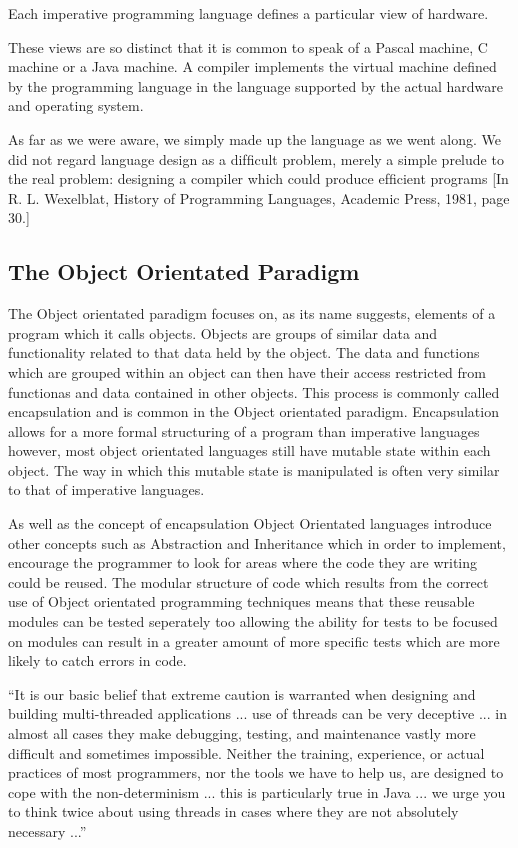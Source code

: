 \documentclass[main.tex]{subfiles}
\begin{document}
Each imperative programming language defines a particular view of hardware.

These views are so distinct that it is common to speak of a Pascal machine, C machine or a Java machine. A compiler implements the virtual machine defined by the programming language in the language supported by the actual hardware and operating system.


As far as we were aware, we simply made up the language as we went along. We did not regard language design as a difﬁcult problem, merely a simple prelude to the real problem: designing a compiler which could produce efﬁcient programs [In R. L. Wexelblat, History of Programming Languages, Academic Press, 
1981, page 30.]

\subsection{The Object Orientated Paradigm}
The Object orientated paradigm focuses on, as its name suggests, elements of a program which it calls objects. Objects are groups of similar data and functionality related to that data held by the object. The data and functions which are grouped within an object can then have their access restricted from functionas and data contained in other objects. This process is commonly called encapsulation and is common in the Object orientated paradigm. Encapsulation allows for a more formal structuring of a program than imperative languages however, most object orientated languages still have mutable state within each object. The way in which this mutable state is manipulated is often very similar to that of imperative languages.\cite{Aaby1996} 

As well as the concept of encapsulation Object Orientated languages introduce other concepts such as Abstraction and Inheritance which in order to implement, encourage the programmer to look for areas where the code they are writing could be reused. \cite{DavidJ.Barnes2008} The modular structure of code which results from the correct use of Object orientated programming techniques means that these reusable modules can be tested seperately too allowing the ability for tests to be focused on modules can result in a greater amount of more specific tests which are more likely to catch errors in code.

``It is our basic belief that extreme caution is warranted when designing and building multi-threaded applications ... use of threads can be very deceptive ... in almost all cases they make debugging, testing, and maintenance vastly more difficult and sometimes impossible.  Neither the training, experience, or actual practices of most programmers, nor the tools we have to help us, are designed to cope with the non-determinism ... this is particularly true in Java ... we urge you to think twice about using threads in cases where they are not absolutely necessary ...'' %
\end{document}

